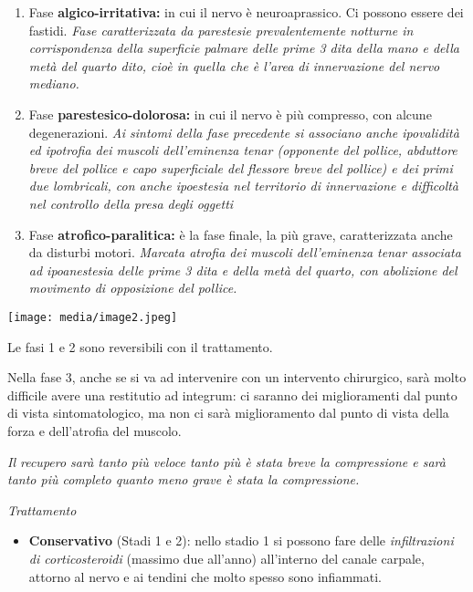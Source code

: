 \documentclass[]{article}
\begin{document}
\begin{enumerate}
\def\labelenumi{\arabic{enumi}.}
\item
  Fase \textbf{algico-irritativa:} in cui il nervo è neuroaprassico. Ci
  possono essere dei fastidi. \emph{Fase caratterizzata da parestesie
  prevalentemente notturne in corrispondenza della superficie palmare
  delle prime 3 dita della mano e della metà del quarto dito, cioè in
  quella che è l'area di innervazione del nervo mediano.}
\item
  Fase \textbf{parestesico-dolorosa:} in cui il nervo è più compresso,
  con alcune degenerazioni. \emph{Ai sintomi della fase precedente si
  associano anche \emph{ipovalidità} ed \emph{ipotrofia dei muscoli
  dell'eminenza tenar} (opponente del pollice, abduttore breve del
  pollice e capo superficiale del flessore breve del pollice) \emph{e
  dei primi due lombricali}, con anche ipoestesia nel territorio di
  innervazione e difficoltà nel controllo della presa degli oggetti}
\item
  Fase \textbf{atrofico-paralitica:} è la fase finale, la più grave,
  caratterizzata anche da disturbi motori. \emph{\emph{Marcata atrofia
  dei muscoli dell'eminenza tenar associata ad ipoanestesia delle prime
  3 dita e della metà del quarto, con abolizione del movimento di
  opposizione del pollice.}}
\end{enumerate}

\texttt{[image: media/image2.jpeg]}

Le fasi 1 e 2 sono reversibili con il trattamento.

Nella fase 3, anche se si va ad intervenire con un intervento
chirurgico, sarà molto difficile avere una restitutio ad integrum: ci
saranno dei miglioramenti dal punto di vista sintomatologico, ma non ci
sarà miglioramento dal punto di vista della forza e dell'atrofia del
muscolo.

\emph{Il recupero sarà tanto più veloce tanto più è stata breve la
compressione e sarà tanto più completo quanto meno grave è stata la
compressione.}

\emph{Trattamento}

\begin{itemize}
\item
  \textbf{Conservativo} (Stadi 1 e 2): nello stadio 1 si possono fare
  delle \emph{infiltrazioni di corticosteroidi} (massimo due all'anno)
  all'interno del canale carpale, attorno al nervo e ai tendini che
  molto spesso sono infiammati.
\end{itemize}
\end{document}
